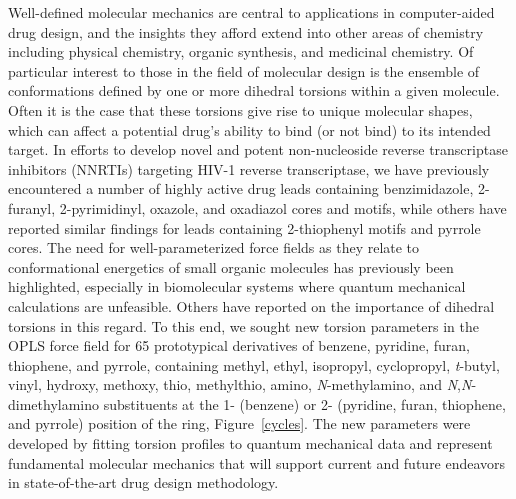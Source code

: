 \documentclass[12pt]{report}
\def\figlab{Figure}\def\figslab{\figlab s}
\newcommand*\fig[1]{\figlab~\ref{#1}}
\begin{document}
Well-defined molecular mechanics are central to applications in computer-aided drug design, and the insights they afford extend into other areas of chemistry including physical chemistry, organic synthesis, and medicinal chemistry.\cite{brameld} Of particular interest to those in the field of molecular design is the ensemble of conformations defined by one or more dihedral torsions within a given molecule. Often it is the case that these torsions give rise to unique molecular shapes, which can affect a potential drug's ability to bind (or not bind) to its intended target. In efforts to develop novel and potent non-nucleoside reverse transcriptase inhibitors (NNRTIs) targeting HIV-1 reverse transcriptase, we have previously encountered a number of highly active drug leads containing benzimidazole,\cite{kroeger} 2-furanyl,\cite{jorgbasa} 2-pyrimidinyl,\cite{thak} oxazole, and oxadiazol\cite{tipopt} cores and motifs, while others have reported similar findings for leads containing 2-thiophenyl motifs\cite{venk} and pyrrole cores.\cite{anto} The need for well-parameterized force fields as they relate to conformational energetics of small organic molecules has previously been highlighted,\cite{terhorst} especially in biomolecular systems where quantum mechanical calculations are unfeasible. Others have reported on the importance of dihedral torsions in this regard.\cite{brameld} To this end, we sought new torsion parameters in the OPLS force field\cite{jorg1996} for 65 prototypical derivatives of benzene, pyridine, furan, thiophene, and pyrrole, containing methyl, ethyl, isopropyl, cyclopropyl, \textit{t}-butyl, vinyl, hydroxy, methoxy, thio, methylthio, amino, \textit{N}-methylamino, and \textit{N},\textit{N}-dimethylamino substituents at the 1- (benzene) or 2- (pyridine, furan, thiophene, and pyrrole) position of the ring, \fig{cycles}. The new parameters were developed by fitting torsion profiles to quantum mechanical data and represent fundamental molecular mechanics that will support current and future endeavors in state-of-the-art drug design methodology.
\end{document}
